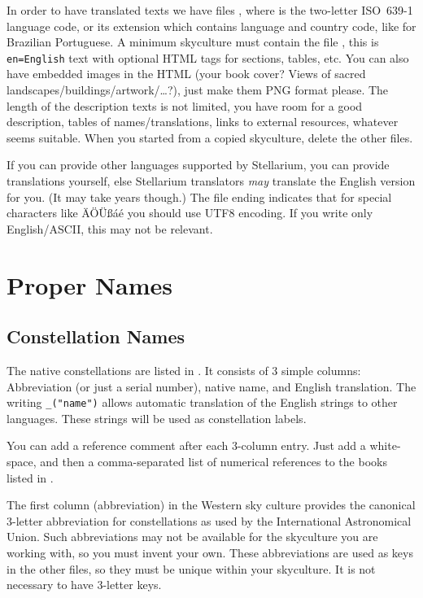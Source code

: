 In order to have translated texts we have files
, where  is the two-letter
ISO~639-1 language code, or its extension which contains language and
country code, like  for Brazilian Portuguese. A minimum
skyculture must contain the file , this is
\texttt{en=English} text with optional HTML tags for sections, tables,
etc. You can also have embedded images in the HTML (your book cover?
Views of sacred landscapes/buildings/artwork/\ldots?), just make them
PNG format please. The length of the description texts is not limited,
you have room for a good description, tables of names/translations,
links to external resources, whatever seems suitable. When you started
from a copied skyculture, delete the other 
files.

If you can provide other languages supported by Stellarium, you can
provide translations yourself, else Stellarium translators \emph{may}
translate the English version for you. (It may take years though.) The file
ending  indicates that for special characters like ÄÖÜßáé
you should use UTF8 encoding. If you write only English/ASCII, this may not
be relevant.

\section{Proper Names}
\label{sec:skycultures:names}

\subsection{Constellation Names}
\label{sec:skycultures:constellations}

The native constellations are listed in
. It consists of 3 simple columns:
Abbreviation (or just a serial number), native name, and English
translation. The writing \texttt{\_("name")} allows automatic
translation of the English strings to other languages. These strings
will be used as constellation labels.

You can  add a reference comment after each
3-column entry. Just add a white-space, and then a comma-separated list
of numerical references to the books listed in .

The first column (abbreviation) in the Western sky culture provides
the canonical 3-letter abbreviation for constellations as used by the
International Astronomical Union. Such abbreviations may not be
available for the skyculture you are working with, so you must invent
your own. These abbreviations are used as keys in the other files, so
they must be unique within your skyculture.
It is not necessary to have 3-letter keys. 

